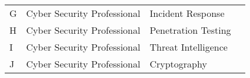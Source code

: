 \begin{tabular}{llll}
  G & Cyber Security Professional  &  Incident Response & \cite{thompsonCyberSecurityPro2024,williamsCyberSecurityPro2023} \\
 H & Cyber Security Professional  & Penetration Testing & \cite{thompsonCyberSecurityPro2024,williamsCyberSecurityPro2023} \\
  I & Cyber Security Professional  & Threat Intelligence & \cite{thompsonCyberSecurityPro2024,williamsCyberSecurityPro2023} \\
 
  J & Cyber Security Professional  &  Cryptography & \cite{thompsonCyberSecurityPro2024,williamsCyberSecurityPro2023} \\
  \hline 
  \end{tabular}

